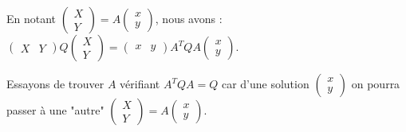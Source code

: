 \documentclass[12pt]{amsart}
\begin{document}
En notant 
$\begin{pmatrix} 
  X \\ 
  Y 
\end{pmatrix}
=
A
\begin{pmatrix} 
  x \\ 
  y 
\end{pmatrix}$,
nous avons :
$\begin{pmatrix} 
  X & Y 
\end{pmatrix}
Q
\begin{pmatrix} 
  X \\ 
  Y 
\end{pmatrix}
=
\begin{pmatrix} 
  x & y 
\end{pmatrix}
A^T Q A
\begin{pmatrix} 
  x \\ 
  y 
\end{pmatrix}$.


\medskip

Essayons de trouver $A$ vérifiant $A^T Q A = Q$ car d'une solution
$\begin{pmatrix} 
  x \\ 
  y 
\end{pmatrix}$
on pourra passer à une "autre"
$\begin{pmatrix} 
  X \\ 
  Y 
\end{pmatrix}
=
A \begin{pmatrix} 
  x \\ 
  y 
\end{pmatrix}$.


\medskip
\end{document}
